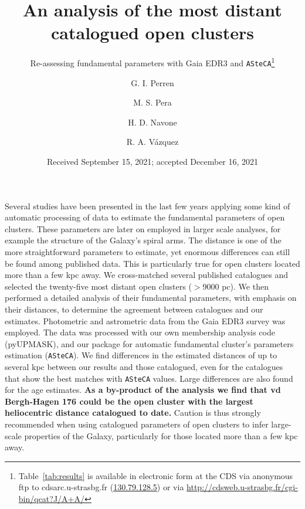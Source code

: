 \documentclass[referee]{aa}
\begin{document}
 


\title{An analysis of the most distant catalogued open clusters}
\subtitle{Re-assessing fundamental parameters with Gaia EDR3 and
\texttt{ASteCA}\thanks{
Table~\ref{tab:results} is available in electronic form
at the CDS via anonymous ftp to cdsarc.u-strasbg.fr (\url{130.79.128.5})
or via \url{http://cdsweb.u-strasbg.fr/cgi-bin/qcat?J/A+A/}}}

\author{G. I. Perren
      \and
      M. S. Pera
      \and
      H. D. Navone
      \and
      R. A. Vázquez
}

\date{Received September 15, 2021; accepted December 16, 2021}

 
\abstract
{Several studies have been presented in the last few years applying some kind of
automatic processing of data to estimate the fundamental parameters of open
clusters. These parameters are later on employed in larger scale analyses, for
example the structure of the Galaxy's spiral arms.
The distance is one of the more straightforward parameters to estimate, yet
enormous differences can still be found among published data. This is
particularly true for open clusters located more than a few kpc away.}
{
We cross-matched several published catalogues and selected the twenty-five most
distant open clusters ($>$9000 pc). We then performed a detailed analysis of
their fundamental parameters, with emphasis on their distances, to determine the
agreement between catalogues and our estimates.}
{Photometric and astrometric data from the Gaia EDR3 survey was employed. The
data was processed with our own membership analysis code (pyUPMASK), and our
package for automatic fundamental cluster's parameters estimation
(\texttt{ASteCA}).}
{We find differences in the estimated distances of up to several kpc
between our results and those catalogued, even for the catalogues that show the
best matches with \texttt{ASteCA} values. Large differences are also found for
the age estimates. \textbf{As a by-product of the analysis we find that
vd Bergh-Hagen 176 could be the open cluster with the largest heliocentric
distance catalogued to date.}}
{Caution is thus strongly recommended when using catalogued parameters of open
clusters to infer large-scale properties of the Galaxy, particularly for those
located more than a few kpc away.}
\end{document}
